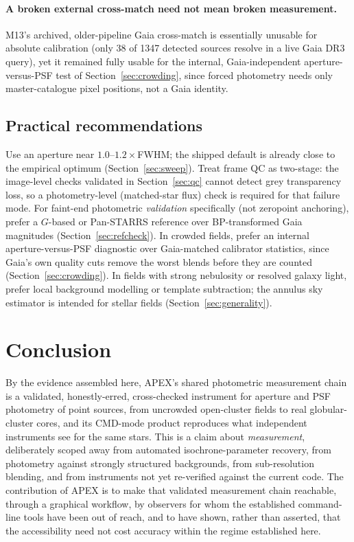 \documentclass[fleqn,usenatbib]{mnras}
\begin{document}
\paragraph*{A broken external cross-match need not mean broken measurement.} M13's archived, older-pipeline Gaia cross-match is essentially unusable for absolute calibration (only 38 of 1347 detected sources resolve in a live Gaia DR3 query), yet it remained fully usable for the internal, Gaia-independent aperture-versus-PSF test of Section~\ref{sec:crowding}, since forced photometry needs only master-catalogue pixel positions, not a Gaia identity.

\subsection{Practical recommendations}

Use an aperture near $1.0$--$1.2\times$FWHM; the shipped default is already close to the empirical optimum (Section~\ref{sec:sweep}). Treat frame QC as two-stage: the image-level checks validated in Section~\ref{sec:qc} cannot detect grey transparency loss, so a photometry-level (matched-star flux) check is required for that failure mode. For faint-end photometric \emph{validation} specifically (not zeropoint anchoring), prefer a $G$-based or Pan-STARRS reference over BP-transformed Gaia magnitudes (Section~\ref{sec:refcheck}). In crowded fields, prefer an internal aperture-versus-PSF diagnostic over Gaia-matched calibrator statistics, since Gaia's own quality cuts remove the worst blends before they are counted (Section~\ref{sec:crowding}). In fields with strong nebulosity or resolved galaxy light, prefer local background modelling or template subtraction; the annulus sky estimator is intended for stellar fields (Section~\ref{sec:generality}).

\section{Conclusion}
\label{sec:conclusion}

By the evidence assembled here, APEX's shared photometric measurement chain is a validated, honestly-erred, cross-checked instrument for aperture and PSF photometry of point sources, from uncrowded open-cluster fields to real globular-cluster cores, and its CMD-mode product reproduces what independent instruments see for the same stars. This is a claim about \emph{measurement}, deliberately scoped away from automated isochrone-parameter recovery, from photometry against strongly structured backgrounds, from sub-resolution blending, and from instruments not yet re-verified against the current code. The contribution of APEX is to make that validated measurement chain reachable, through a graphical workflow, by observers for whom the established command-line tools have been out of reach, and to have shown, rather than asserted, that the accessibility need not cost accuracy within the regime established here.
\end{document}
